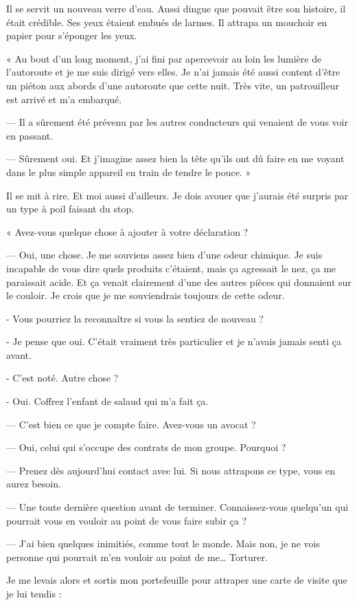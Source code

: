 Il se servit un nouveau verre d'eau. Aussi dingue que pouvait être son histoire, il était crédible. Ses yeux étaient
embués de larmes. Il attrapa un mouchoir en papier pour s'éponger les yeux.

« Au bout d'un long moment, j'ai fini par apercevoir au loin les lumière de l'autoroute et je me suis dirigé vers elles.
Je n'ai jamais été aussi content d'être un piéton aux abords d'une autoroute que cette nuit. Très vite, un patrouilleur
est arrivé et m'a embarqué.

— Il a sûrement été prévenu par les autres conducteurs qui venaient de vous voir en passant.

— Sûrement oui. Et j'imagine assez bien la tête qu'ils ont dû faire en me voyant dans le plus simple appareil en train
de tendre le pouce. »

Il se mit à rire. Et moi aussi d'ailleurs. Je dois avouer que j'aurais été surpris par un type à poil faisant du stop.

« Avez-vous quelque chose à ajouter à votre déclaration ?

— Oui, une chose. Je me souviens assez bien d'une odeur chimique. Je suis incapable de vous dire quels produits
c'étaient, mais ça agressait le nez, ça me paraissait acide. Et ça venait clairement d'une des autres pièces qui
donnaient sur le couloir. Je crois que je me souviendrais toujours de cette odeur.

- Vous pourriez la reconnaître si vous la sentiez de nouveau ?

- Je pense que oui. C'était vraiment très particulier et je n'avais jamais senti ça avant.

- C'est noté. Autre chose ?

- Oui. Coffrez l'enfant de salaud qui m'a fait ça.

— C'est bien ce que je compte faire. Avez-vous un avocat ?

— Oui, celui qui s'occupe des contrats de mon groupe. Pourquoi ?

— Prenez dès aujourd'hui contact avec lui. Si nous attrapons ce type, vous en aurez besoin.

— Une toute dernière question avant de terminer. Connaissez-vous quelqu'un qui pourrait vous en vouloir au point de 
vous faire subir ça ?

— J'ai bien quelques inimitiés, comme tout le monde. Mais non, je ne vois personne qui pourrait m'en vouloir au point 
de me… Torturer.

Je me levais alors et sortis mon portefeuille pour attraper une carte de visite que je lui tendis :


